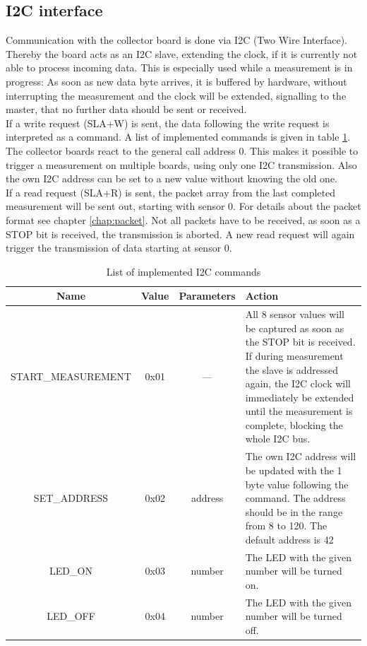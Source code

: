 \documentclass[a4paper]{scrreprt}
\begin{document}
\subsection{I2C interface}
Communication with the collector board is done via I2C (Two Wire Interface). Thereby the board acts as an
I2C slave, extending the clock, if it is currently not able to process incoming data.
This is especially used while a measurement is in progress: As soon as new data byte arrives,
it is buffered by hardware, without interrupting the measurement and the clock will be extended, signalling to the master, that no further data should be sent or received.\\
If a write request (SLA+W) is sent, the data following the write request is interpreted as a command. A list of implemented commands is given
in table \ref{tab:i2c}. The collector boards react to the general call address 0. This makes it possible to trigger a measurement
on multiple boards, using only one I2C transmission.
Also the own I2C address can be set to a new value without knowing the old one.\\
If a read request (SLA+R) is sent, the packet array from the last completed measurement will be sent out, starting with sensor 0.
For details about the packet format see chapter \ref{chap:packet}. Not all packets have to be received, as soon as a STOP bit is
received, the transmission is aborted. A new read request will again trigger the transmission of data starting at sensor 0.
\begin{table}[Hh!]
	\centering
	\begin{tabularx}{\textwidth}{ | c | c | c | X | }
		\hline
    Name & Value & Parameters & Action\\
		\hline
		\hline
    START\_MEASUREMENT & 0x01 & --- & All 8 sensor values will be
    captured as soon as the STOP bit is received. If during
    measurement
		the slave is addressed again, the I2C clock will immediately be extended until the measurement is complete, blocking the whole I2C bus.\\
		\hline
    SET\_ADDRESS & 0x02 & address & The own I2C address will be updated with the 1 byte value following the command. The address should
		be in the range from 8 to 120. The default address is 42\\
		\hline
    LED\_ON & 0x03 & number & The LED with the given number will be turned on.\\
		\hline
    LED\_OFF & 0x04 & number & The LED with the given number will be turned off.\\
		\hline
	\end{tabularx}
	\caption{List of implemented I2C commands}
	\label{tab:i2c}
\end{table}
\end{document}
